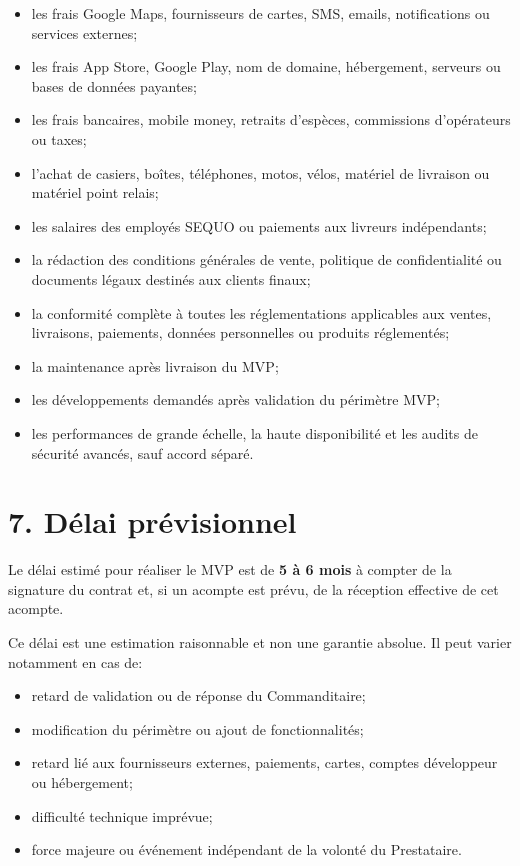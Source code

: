 \documentclass[11pt,a4paper]{article}
\begin{document}
\begin{itemize}
    \item les frais Google Maps, fournisseurs de cartes, SMS, emails, notifications ou services externes;
    \item les frais App Store, Google Play, nom de domaine, hébergement, serveurs ou bases de données payantes;
    \item les frais bancaires, mobile money, retraits d'espèces, commissions d'opérateurs ou taxes;
    \item l'achat de casiers, boîtes, téléphones, motos, vélos, matériel de livraison ou matériel point relais;
    \item les salaires des employés SEQUO ou paiements aux livreurs indépendants;
    \item la rédaction des conditions générales de vente, politique de confidentialité ou documents légaux destinés aux clients finaux;
    \item la conformité complète à toutes les réglementations applicables aux ventes, livraisons, paiements, données personnelles ou produits réglementés;
    \item la maintenance après livraison du MVP;
    \item les développements demandés après validation du périmètre MVP;
    \item les performances de grande échelle, la haute disponibilité et les audits de sécurité avancés, sauf accord séparé.
\end{itemize}

\section*{7. Délai prévisionnel}

Le délai estimé pour réaliser le MVP est de \textbf{5 à 6 mois} à compter de la signature du contrat et, si un acompte est prévu, de la réception effective de cet acompte.

Ce délai est une estimation raisonnable et non une garantie absolue. Il peut varier notamment en cas de:

\begin{itemize}
    \item retard de validation ou de réponse du Commanditaire;
    \item modification du périmètre ou ajout de fonctionnalités;
    \item retard lié aux fournisseurs externes, paiements, cartes, comptes développeur ou hébergement;
    \item difficulté technique imprévue;
    \item force majeure ou événement indépendant de la volonté du Prestataire.
\end{itemize}
\end{document}
